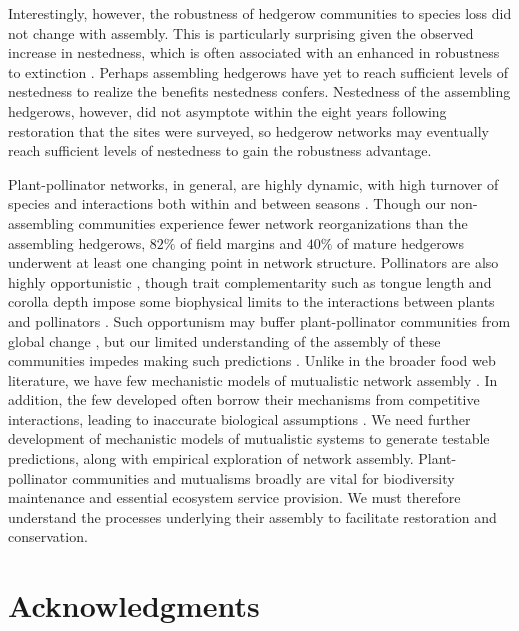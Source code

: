 \documentclass[12pt]{article}
\begin{document}
Interestingly, however, the robustness of hedgerow communities to
species loss did not change with assembly. This is particularly
surprising given the observed increase in nestedness, which is often
associated with an enhanced in robustness to extinction
\citep{Memmott2004}. Perhaps assembling hedgerows have yet to reach sufficient
levels of nestedness to realize the benefits nestedness
confers. Nestedness of the assembling hedgerows, however, did not
asymptote within the eight years following restoration that the sites
were surveyed, so hedgerow networks may eventually reach sufficient
levels of nestedness to gain the robustness advantage.

Plant-pollinator networks, in general, are highly dynamic, with high
turnover of species and interactions both within and between seasons
\citep{Burkle2011}. Though our non-assembling communities experience
fewer network reorganizations than the assembling hedgerows, $82\%$ of
field margins and $40\%$ of mature hedgerows underwent at least one
changing point in network structure. Pollinators are also highly
opportunistic \citep{petanidou-2008-564, Vazquez2005b,
  albrecht2010plant}, though trait complementarity such as tongue
length and corolla depth impose some biophysical limits to the
interactions between plants and pollinators
\citep{Vazquez2009evaluating, Vazquez2009, Stang2009, Stang2006,
  Santamaria2007}. Such opportunism may buffer plant-pollinator
communities from global change \citep[e.g.,][]{ramos2012topological,
  kaiser2010robustness}, but our limited understanding of the assembly
of these communities impedes making such predictions
\citep{Vazquez2009, Burkle2011}. Unlike in the broader food web
literature, we have few mechanistic models of mutualistic network
assembly \citep{valdovinos2013adaptive, Nuismer2013, Guimaraes2011}.
In addition, the few developed often borrow their mechanisms from
competitive interactions, leading to inaccurate biological assumptions
\citep{holland2006comment}. We need further development of mechanistic
models of mutualistic systems to generate testable predictions, along
with empirical exploration of network assembly. Plant-pollinator
communities and mutualisms broadly are vital for biodiversity
maintenance and essential ecosystem service provision. We must
therefore understand the processes underlying their assembly to
facilitate restoration and conservation.

\section*{Acknowledgments}
\label{sec:acknowledge}
\end{document}
